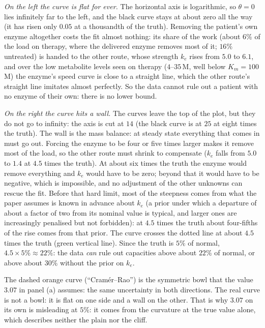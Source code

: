 \documentclass[11pt,a4paper]{article}
\begin{document}
\emph{On the left the curve is flat for ever.} The horizontal axis is logarithmic, so $\theta=0$
lies infinitely far to the left, and the black curve stays at about zero all the way (it has risen
only $0.05$ at a thousandth of the truth). Removing the patient's own enzyme altogether costs the
fit almost nothing: its share of the work (about $6\%$ of the load on therapy, where the
delivered enzyme removes most of it; $16\%$ untreated) is handed to the other route, whose
strength $k_e$ rises from
$5.0$ to $6.1$, and over the low metabolite levels seen on therapy ($4$--$35$\,\textmu M, well below
$K_m=100$\,\textmu M) the enzyme's speed curve is close to a straight line, which the other
route's straight line imitates almost perfectly. So the data cannot rule out a patient with no
enzyme of their own: there is no lower bound.

\emph{On the right the curve hits a wall.} The curves leave the top of the plot, but they do not go
to infinity: the axis is cut at $14$ (the black curve is at $25$ at eight times the truth). The wall
is the mass balance: at steady state everything that comes in must go out. Forcing the enzyme to
be four or five times larger makes it remove most of the load, so the other route must shrink to
compensate ($k_e$ falls from $5.0$ to $1.4$ at $4.5$ times the truth). At about six times the truth
the enzyme would remove everything and $k_e$ would have to be zero; beyond that it would have to be
negative, which is impossible, and no adjustment of the other unknowns can rescue the fit. Before
that hard limit, most of the steepness comes from what the paper assumes is known in advance about
$k_e$ (a prior under which a departure of about a factor of two from its nominal value is
typical, and larger ones are increasingly penalised but not forbidden): at $4.5$ times
the truth about four-fifths of the rise comes from that prior. The curve crosses the dotted line
at about $4.5$ times the truth (green vertical line). Since the truth is $5\%$ of normal,
$4.5\times5\%\approx22\%$: the data \emph{can} rule out capacities above about $22\%$ of normal, or
above about $30\%$ without the prior on $k_e$.

The dashed orange curve (``Cram\'er--Rao'') is the symmetric bowl that the value $3.07$ in panel (a)
assumes: the same uncertainty in both directions. The real curve is not a bowl: it is flat on one
side and a wall on the other. That is why $3.07$ on its own is misleading at $5\%$: it comes from
the curvature at the true value alone, which describes neither the plain nor the cliff.
\end{document}
